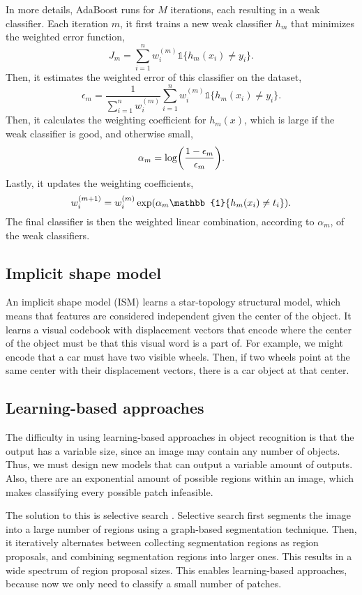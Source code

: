 In more details, AdaBoost \citep{freund1996experiments} runs for $M$
iterations, each resulting in a weak classifier. Each iteration $m$, it first
trains a new weak classifier $h_m$ that minimizes the weighted error function,
\[
  J_m = \sum_{i=1}^n w_i^{(m)} \mathbb{1} \{ h_m(x_i) \neq y_i \}
.\]
Then, it estimates the weighted error of this classifier on the dataset, \[
  \epsilon_m = \frac{1}{\sum_{i=1}^n w_i^{(m)}} \sum_{i=1}^n w_i^{(m)} \mathbb{1} \{ h_m(x_i) \neq y_i \}
.\]
Then, it calculates the weighting coefficient for $h_m(x)$, which is large if
the weak classifier is good, and otherwise small, \[
  \alpha_m = \log \lft( \frac{1 - \epsilon_m}{\epsilon_m} \rgt)
.\]
Lastly, it updates the weighting coefficients, \[
  w_i^{(m+1)} = w_i^{(m)} \exp\lft( \alpha_m \mathbb{1} \{ h_m(x_i) \neq t_i \} \rgt)
.\]
The final classifier is then the weighted linear combination, according to
$\alpha_m$, of the weak classifiers.

\subsection{Implicit shape model}

An implicit shape model (ISM) learns a star-topology structural model, which
means that features are considered independent given the center of the object.
It learns a visual codebook with displacement vectors that encode where the
center of the object must be that this visual word is a part of. For example,
we might encode that a car must have two visible wheels. Then, if two wheels
point at the same center with their displacement vectors, there is a car object
at that center.

\subsection{Learning-based approaches}

The difficulty in using learning-based approaches in object recognition is that
the output has a variable size, since an image may contain any number of
objects. Thus, we must design new models that can output a variable amount of
outputs. Also, there are an exponential amount of possible regions within an
image, which makes classifying every possible patch infeasible.

The solution to this is selective search \citep{uijlings2013selective}.
Selective search first segments the image into a large number of regions using
a graph-based segmentation technique. Then, it iteratively alternates between
collecting segmentation regions as region proposals, and combining segmentation
regions into larger ones. This results in a wide spectrum of region proposal
sizes. This enables learning-based approaches, because now we only need to
classify a small number of patches.

